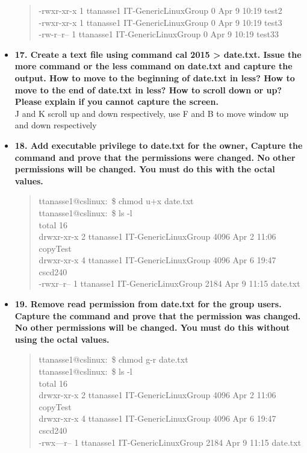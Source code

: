 \documentclass{article}
\begin{document}
\begin{itemize}
\begin{quote}
-rwxr-xr-x 1 ttanasse1 IT-GenericLinuxGroup    0 Apr  9 10:19 test2\\
-rwxr-xr-x 1 ttanasse1 IT-GenericLinuxGroup    0 Apr  9 10:19 test3\\
-rw-r--r-- 1 ttanasse1 IT-GenericLinuxGroup    0 Apr  9 10:19 test33
\end{quote}
\item \textbf{17. Create a text file using command cal 2015 > date.txt. Issue the more command or the less command on date.txt and capture the output. How to move to the beginning of date.txt in less? How to move to the end of date.txt in less? How to scroll down or up? Please explain if you cannot capture the screen.}\\
J and K scroll up and down respectively, use F and B to move window up and down respectively
\item \textbf{18. Add executable privilege to date.txt for the owner, Capture the command and prove that the permissions were changed. No other permissions will be changed.  You must do this with the octal values.}\\
\begin{quote}
  ttanasse1@cslinux:~\$ chmod u+x date.txt \\
ttanasse1@cslinux:~\$ ls -l\\
total 16\\
drwxr-xr-x 2 ttanasse1 IT-GenericLinuxGroup 4096 Apr  2 11:06 copyTest\\
drwxr-xr-x 4 ttanasse1 IT-GenericLinuxGroup 4096 Apr  6 19:47 cscd240\\
-rwxr--r-- 1 ttanasse1 IT-GenericLinuxGroup 2184 Apr  9 11:15 date.txt\\
\end{quote}
\item \textbf{19. Remove read permission from date.txt for the group users. Capture the command and prove that the permission was changed. No other permissions will be changed.  You must do this without using the octal values.}
\begin{quote}
  ttanasse1@cslinux:~\$ chmod g-r date.txt \\
ttanasse1@cslinux:~\$ ls -l\\
total 16\\
drwxr-xr-x 2 ttanasse1 IT-GenericLinuxGroup 4096 Apr  2 11:06 copyTest\\
drwxr-xr-x 4 ttanasse1 IT-GenericLinuxGroup 4096 Apr  6 19:47 cscd240\\
-rwx---r-- 1 ttanasse1 IT-GenericLinuxGroup 2184 Apr  9 11:15 date.txt

\end{quote}
\end{itemize}
\end{document}
